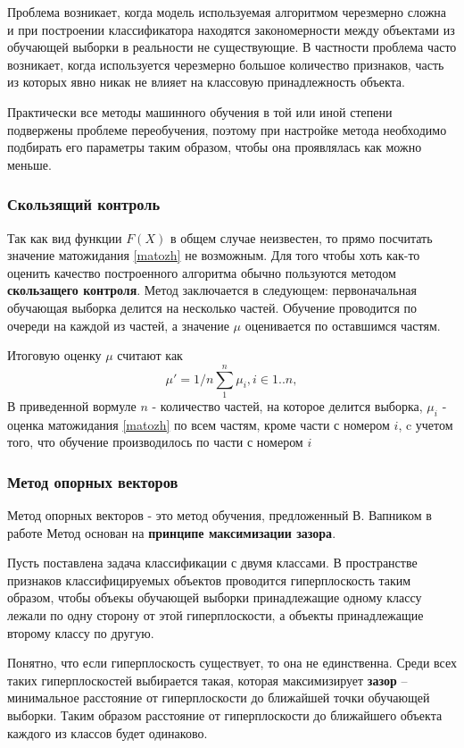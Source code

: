 Проблема возникает, когда модель используемая алгоритмом черезмерно сложна и при построении классификатора находятся закономерности между объектами из обучающей выборки в реальности не существующие. В частности проблема часто возникает, когда используется черезмерно большое количество признаков, часть из которых явно никак не влияет на классовую принадлежность объекта.

Практически все методы машинного обучения в той или иной степени подвержены проблеме переобучения, поэтому при настройке метода необходимо подбирать его параметры таким образом, чтобы она проявлялась как можно меньше.
\subsubsection{Скользящий контроль}
Так как вид функции $F(X)$ в общем случае  неизвестен, то прямо посчитать значение матожидания \ref{matozh} не возможным. Для того чтобы хоть как-то оценить качество построенного алгоритма обычно пользуются методом \textbf{скользащего контроля}. Метод заключается в следующем: первоначальная обучающая выборка делится на несколько частей. Обучение проводится по очереди на каждой из частей, а значение $\mu$ оценивается по оставшимся частям.

Итоговую оценку $\mu$ считают как
\begin{equation}
\mu' = 1/n\sum_1^n{\mu_i}, i \in 1..n, 
\end{equation}
В приведенной вормуле $n$ - количество частей, на которое делится выборка, $\mu_i$ - оценка матожидания \ref{matozh} по всем частям, кроме части с номером $i$, c учетом того, что обучение производилось по части с номером $i$


\subsubsection{Метод опорных векторов}
Метод опорных векторов - это метод обучения, предложенный В. Вапником в работе \cite{SVN}
Метод основан на \textbf{принципе максимизации зазора}. 

Пусть поставлена задача классификации с двумя классами. В пространстве признаков классифицируемых объектов проводится гиперплоскость таким образом, чтобы объекы обучающей выборки принадлежащие одному классу лежали по одну сторону от этой гиперплоскости, а объекты принадлежащие второму классу по другую.

Понятно, что если гиперплоскость существует, то она не единственна. Среди всех таких гиперплоскостей выбирается такая, которая максимизирует \textbf{зазор} -- минимальное расстояние от гиперплоскости до ближайшей точки обучающей выборки. Таким образом расстояние от гиперплоскости до ближайшего объекта каждого из классов будет одинаково.

